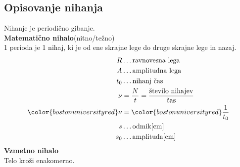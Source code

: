 {\color{indiagreen}\subsection{Opisovanje nihanja}}
Nihanje je periodično gibanje.\\
\textbf{Matematično nihalo}(nitno/težno)\\
1 perioda je 1 nihaj, ki je od ene skrajne lege do druge skrajne lege in nazaj.\\
\begin{align*}
	R &\dots \text{ravnovesna lega}\\
	A &\dots \text{amplitudna lega}\\
	t_0 &\dots \text{nihanj čas}\\
	\nu &= \frac{N}{t} = \frac{\text{število nihajev}}{\text{čas}}\\
	{\color{bostonuniversityred}\nu} &= {\color{bostonuniversityred}\frac{1}{t_0}}\\
	s &\dots \text{odmik[cm]}\\
	s_0 &\dots \text{amplituda[cm]}\\
\end{align*}
\textbf{Vzmetno nihalo}\\
Telo kroži enakomerno.\\
\\

